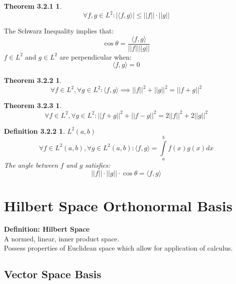 \documentclass{article}
\theoremstyle{plain}
\newtheorem*{definition322*}{Definition 3.2.2}
\newtheorem*{theorem321*}{Theorem 3.2.1}
\newtheorem*{theorem322*}{Theorem 3.2.2}
\newtheorem*{theorem323*}{Theorem 3.2.3}
\begin{document}
\begin{theorem321*}  \\
$$ \forall f, g \in L^{2} : | \langle f, g \rangle | \leq || f || \cdot || g || $$
\end{theorem321*}
\noindent The Schwarz Inequality implies that: $$ \cos \theta = \frac{ \langle f,g \rangle}{ ||f|| ||g|| } $$
\noindent $ f \in L^{2} $ and $ g \in L^{2} $ are perpendicular when: $$ \langle f, g \rangle = 0 $$

\begin{theorem322*}  \\
$$ \forall f \in L^{2}, \forall g \in L^{2} : \langle f, g \rangle \implies || f ||^{2} + || g ||^{2} = || f + g ||^{2} $$
\end{theorem322*}

\begin{theorem323*}  \\
$$ \forall f \in L^{2}, \forall g \in L^{2} : || f + g ||^{2} + || f - g ||^{2} = 2 || f ||^{2} + 2 || g ||^{2} $$

\end{theorem323*}

\begin{definition322*}  $L^{2}\left(a,b\right)$  \\
$$ \forall f \in L^{2}\left(a,b\right), \forall g \in L^{2}\left(a,b\right) : \langle f, g \rangle = \int\limits_{a}^{b} f\left(x\right) g\left(x\right) dx $$
The angle between $ f $ and $ g $ satisfies:
$$ || f || \cdot || g || \cdot \cos \theta = \langle f, g \rangle $$ 
\end{definition322*}

\section*{Hilbert Space Orthonormal Basis}

\textbf{Definition: Hilbert Space} \\
A normed, linear, inner product space. \\
Possess properties of Euclidean space which allow for application of calculus.

\subsection*{Vector Space Basis}
\end{document}
